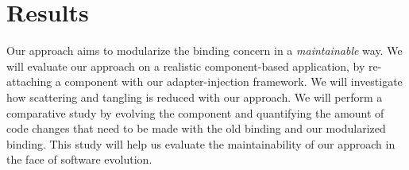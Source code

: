 \documentclass{acm_proc_article-sp}
\begin{document}
\section{Results}
Our approach aims to modularize the binding concern in a \emph{maintainable} way. We will evaluate our approach on a realistic component-based application, by re-attaching a component with our adapter-injection framework. We will investigate how scattering and tangling is reduced with our approach. We will perform a comparative study by evolving the component and quantifying the amount of code changes that need to be made with the old binding and our modularized binding. This study will help us evaluate the maintainability of our approach in the face of software evolution.



\end{document}
